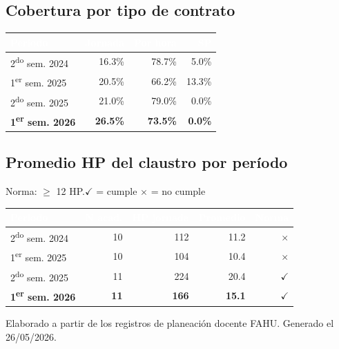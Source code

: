 \documentclass[11pt, a4paper]{article}
\begin{document}
\subsection{Cobertura por tipo de contrato}

\begin{tabular}{lrrr}
\toprule
\rowcolor{usachDark} \textbf{\textcolor{white}{Periodo}} & \textbf{\textcolor{white}{Jornada}} & \textbf{\textcolor{white}{Por hora}} & \textbf{\textcolor{white}{SP}} \\
\midrule
2\textsuperscript{do} sem. 2024 & 16.3\% & 78.7\% & 5.0\% \\
\rowcolor{rowEven}1\textsuperscript{er} sem. 2025 & 20.5\% & 66.2\% & 13.3\% \\
2\textsuperscript{do} sem. 2025 & 21.0\% & 79.0\% & 0.0\% \\
\rowcolor{rowHighlight}\textbf{1\textsuperscript{er} sem. 2026} & \textbf{26.5\%} & \textbf{73.5\%} & \textbf{0.0\%} \\
\bottomrule
\end{tabular}

\subsection{Promedio HP del claustro por período}

Norma: $\geq$ 12 HP.\quad$\checkmark$ = cumple \quad $\times$ = no cumple

\begin{tabular}{lrrrr}
\toprule
\rowcolor{usachDark} \textbf{\textcolor{white}{Periodo}} & \textbf{\textcolor{white}{N acad.}} & \textbf{\textcolor{white}{HP jornada}} & \textbf{\textcolor{white}{Promedio}} & \textbf{\textcolor{white}{Norma}} \\
\midrule
2\textsuperscript{do} sem. 2024 & 10 & 112 & 11.2 & $\times$ \\
\rowcolor{rowEven}1\textsuperscript{er} sem. 2025 & 10 & 104 & 10.4 & $\times$ \\
2\textsuperscript{do} sem. 2025 & 11 & 224 & 20.4 & $\checkmark$ \\
\rowcolor{rowHighlight}\textbf{1\textsuperscript{er} sem. 2026} & \textbf{11} & \textbf{166} & \textbf{15.1} & \textbf{$\checkmark$} \\
\bottomrule
\end{tabular}

\vfill
{\footnotesize\color{gray} Elaborado a partir de los registros de planeación docente FAHU. Generado el 26/05/2026.}
\end{document}
